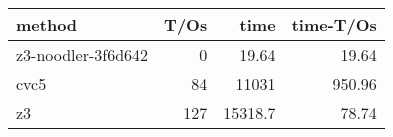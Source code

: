 \begin{tabular}{lrrr}
\hline
 method             &   T/Os &     time &   time-T/Os \\
\hline
 z3-noodler-3f6d642 &      0 &    19.64 &       19.64 \\
 cvc5               &     84 & 11031    &      950.96 \\
 z3                 &    127 & 15318.7  &       78.74 \\
\hline
\end{tabular}
